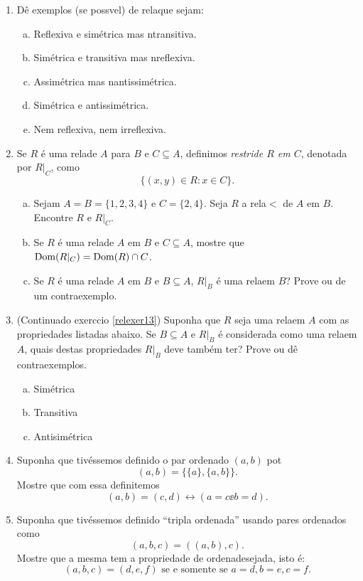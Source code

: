\begin{enumerate}[{\bf 1.}]
\item D\^e exemplos (se poss\ih vel) de rela\coes que sejam:
\begin{enumerate}[a)]
\item Reflexiva e sim\'etrica mas n\ao transitiva.
\item Sim\'etrica e transitiva mas n\ao reflexiva.
\item Assim\'etrica mas n\ao antissim\'etrica.
\item Sim\'etrica e antissim\'etrica.
\item Nem reflexiva, nem irreflexiva.
\end{enumerate}

\item\label{relexer13} Se $R$ \'e uma rela\cao de $A$ para $B$ e $C\subseteq A$, definimos {\it restri\cao de $R$ em $C$}, denotada por $R|_C$, como
\[
\{(x,y)\in R: x\in C\}.
\]
\begin{enumerate}[a)]
\item Sejam $A=B=\{1,2,3,4\}$ e $C=\{2,4\}$. Seja $R$ a rela\cao $<$ de $A$ em $B$. Encontre $R$ e $R|_C$. 
\item Se $R$ \'e uma rela\cao de $A$ em $B$ e $C\subseteq A$, mostre que $\operatorname{Dom}(R|_C)=\operatorname{Dom}(R)\cap C$.
\item Se $R$ \'e uma rela\cao de $A$ em $B$ e $B\subseteq A$, $R|_B$ \'e uma rela\cao em $B$? Prove ou de um contraexemplo. 
\end{enumerate}

\item (Continua\cao do exerc\ih cio \ref{relexer13}) Suponha que $R$ seja uma rela\cao em $A$ com as propriedades listadas abaixo. Se $B\subseteq A$ e $R|_B$ \'e considerada como uma rela\cao em $A$, quais destas propriedades $R|_B$ deve tamb\'em ter? Prove ou d\^e contraexemplos.
\begin{enumerate}[a)]
\item Sim\'etrica 
\item Transitiva
\item Antisim\'etrica
\end{enumerate}

\item Suponha que tiv\'essemos definido o par ordenado $(a,b)$ pot
\[
(a,b)=\{\{a\},\{a,b\}\}.
\]
Mostre que com essa defini\cao temos
\[
(a,b)=(c,d)\leftrightarrow(a=c\ee b=d).
\]


\item Suponha que tiv\'essemos definido ``tripla ordenada'' usando pares ordenados como
\[
(a,b,c)=((a,b),c).
\]
Mostre que a mesma tem a propriedade de ordena\cao desejada, isto \'e:
\[
(a,b,c)=(d,e,f)\textrm{ se e somente se }a=d,b=e,c=f.
\]



\end{enumerate}
